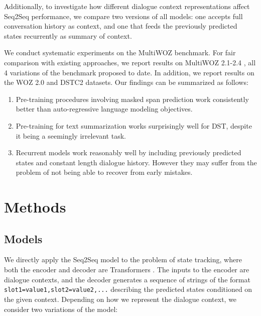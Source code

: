 \documentclass[11pt]{article}
\begin{document}
Additionally, to investigate how different dialogue context representations affect Seq2Seq performance, we compare two versions of all models: one accepts full conversation history as context, and one that feeds the previously predicted states recurrently as summary of context.



We conduct systematic experiments on the MultiWOZ \cite{budzianowski-etal-2018-multiwoz} benchmark. For fair comparison with existing approaches, we report results on MultiWOZ 2.1-2.4 \cite{eric2019multiwoz,zhang2020multiwoz,han2020multiwoz,ye2021multiwoz}, all 4 variations of the benchmark proposed to date. In addition, we report results on the WOZ 2.0 \cite{wen2016networkbased} and DSTC2 \cite{henderson2014second} datasets. Our findings can be summarized as follows:
\begin{enumerate} [nolistsep]
    \item Pre-training procedures involving masked span prediction work consistently better than auto-regressive language modeling objectives.
    \item Pre-training for text summarization works surprisingly well for DST, despite it being a seemingly irrelevant task.
    \item Recurrent models work reasonably well by including previously predicted states and constant length dialogue history. However they may suffer from the problem of not being able to recover from early mistakes.
\end{enumerate}


\section{Methods}
\subsection{Models} \label{sec:models}
We directly apply the Seq2Seq model to the problem of state tracking, where both the encoder and decoder are Transformers \cite{vaswani17attention}. The inputs to the encoder are dialogue contexts, and the decoder generates a sequence of strings of the format \texttt{slot1=value1,slot2=value2,...} describing the predicted states conditioned on the given context. Depending on how we represent the dialogue context, we consider two variations of the model:
\end{document}
